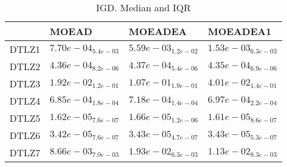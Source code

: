 \documentclass{article}
\begin{document}
\
\begin{table}
\caption{IGD. Median and IQR}
\label{table:median.IGD}
\begin{scriptsize}
\centering
\begin{tabular}{llll}
\hline & MOEAD & MOEADEA &  MOEADEA1\\
\hline
DTLZ1 & \cellcolor{gray95}$  7.70e-04_{ 5.4e-03}$ & $  5.59e-03_{ 1.2e-02}$ & $  1.53e-03_{ 6.3e-03}$ \\
DTLZ2 & \cellcolor{gray25}$  4.36e-04_{ 8.2e-06}$ & $  4.37e-04_{ 5.4e-06}$ & \cellcolor{gray95}$  4.35e-04_{ 6.9e-06}$ \\
DTLZ3 & \cellcolor{gray95}$  1.92e-02_{ 1.2e-01}$ & $  1.07e-01_{ 1.9e-01}$ & $  4.01e-02_{ 1.4e-01}$ \\
DTLZ4 & \cellcolor{gray95}$  6.85e-04_{ 1.8e-04}$ & $  7.18e-04_{ 1.4e-04}$ & $  6.97e-04_{ 2.2e-04}$ \\
DTLZ5 & \cellcolor{gray25}$  1.62e-05_{ 7.6e-07}$ & $  1.66e-05_{ 1.2e-06}$ & \cellcolor{gray95}$  1.61e-05_{ 8.6e-07}$ \\
DTLZ6 & \cellcolor{gray95}$  3.42e-05_{ 7.6e-07}$ & \cellcolor{gray25}$  3.43e-05_{ 4.7e-07}$ & $  3.43e-05_{ 5.3e-07}$ \\
DTLZ7 & \cellcolor{gray95}$  8.66e-03_{ 7.0e-03}$ & $  1.93e-02_{ 6.3e-03}$ & $  1.13e-02_{ 8.3e-03}$ \\
\hline
\end{tabular}
\end{scriptsize}
\end{table}
\end{document}
